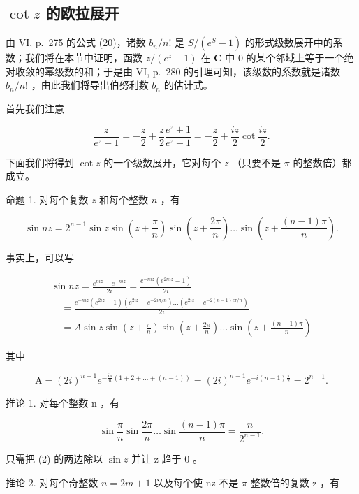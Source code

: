 \subsection{\texorpdfstring{\(\cot z\) 的欧拉展开}{cot z 的欧拉展开}}

由 VI, p.~275 的公式 (20)，诸数 \(b_{n} / n!\) 是 \(S / (e^{S} - 1)\) 的形式级数展开中的系数；我们将在本节中证明，函数 \(z / (e^{z} - 1)\) 在 \(\mathbf{C}\) 中 0 的某个邻域上等于一个绝对收敛的幂级数的和；于是由 VI, p.~280 的引理可知，该级数的系数就是诸数 \(b_{n} / n!\) ，由此我们将导出伯努利数 \(b_{n}\) 的估计式。

首先我们注意

\[
{\frac {z}{e ^ {z} - 1}} = - {\frac {z}{2}} + {\frac {z}{2}} {\frac {e ^ {z} + 1}{e ^ {z} - 1}} = - {\frac {z}{2}} + {\frac {i z}{2}} \cot {\frac {i z}{2}}.\tag{1}
\]

下面我们将得到 \(\cot z\) 的一个级数展开，它对每个 \(z\) （只要不是 \(\pi\) 的整数倍）都成立。

命题 1. 对每个复数 \(z\) 和每个整数 \(n\) ，有

\[
\sin n z = 2 ^ {n - 1} \sin z \sin \left(z + \frac {\pi}{n}\right) \sin \left(z + \frac {2 \pi}{n}\right) \dots \sin \left(z + \frac {(n - 1) \pi}{n}\right).\tag{2}
\]

事实上，可以写

\[
\begin{array}{l} \sin n z = \frac {e ^ {n i z} - e ^ {- n i z}}{2 i} = \frac {e ^ {- n i z} (e ^ {2 n i z} - 1)}{2 i} \\ \quad = \frac {e ^ {- n i z} (e ^ {2 i z} - 1) (e ^ {2 i z} - e ^ {- 2 i \pi / n}) \dots (e ^ {2 i z} - e ^ {- 2 (n - 1) i \pi / n})}{2 i} \\ \quad = A \sin z \sin \left(z + \frac {\pi}{n}\right) \sin \left(z + \frac {2 \pi}{n}\right) \dots \sin \left(z + \frac {(n - 1) \pi}{n}\right) \end{array}
\]

其中

\[
\mathrm{A} = (2 i) ^ {n - 1} e ^ {- \frac {i \pi}{n} (1 + 2 + \dots + (n - 1))} = (2 i) ^ {n - 1} e ^ {- i (n - 1) \frac {\pi}{2}} = 2 ^ {n - 1}.
\]

推论 1. 对每个整数 n ，有

\[
\sin \frac {\pi}{n} \sin \frac {2 \pi}{n} \dots \sin \frac {(n - 1) \pi}{n} = \frac {n}{2 ^ {n - 1}}.\tag{3}
\]

只需把 (2) 的两边除以 \(\sin z\) 并让 z 趋于 0 。

推论 2. 对每个奇整数 \(n = 2m + 1\) 以及每个使 nz 不是 \(\pi\) 整数倍的复数 z ，有

